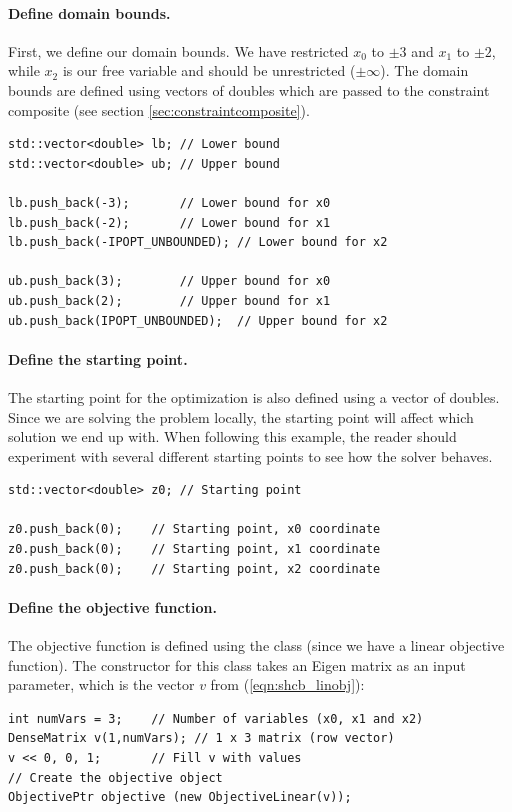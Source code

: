 \paragraph{Define domain bounds.} First, we define our domain bounds. We have restricted $x_0$ to $\pm 3$ and $x_1$ to $\pm2$, while $x_2$ is our free variable and should be unrestricted ($\pm \infty$). The domain bounds are defined using vectors of doubles which are passed to the constraint composite (see section \ref{sec:constraintcomposite}).
\begin{lstlisting}
std::vector<double> lb;	// Lower bound
std::vector<double> ub;	// Upper bound

lb.push_back(-3);		// Lower bound for x0
lb.push_back(-2);		// Lower bound for x1
lb.push_back(-IPOPT_UNBOUNDED);	// Lower bound for x2

ub.push_back(3);		// Upper bound for x0
ub.push_back(2);		// Upper bound for x1
ub.push_back(IPOPT_UNBOUNDED);	// Upper bound for x2
\end{lstlisting}

\paragraph{Define the starting point.} The starting point for the optimization is also defined using a vector of doubles. Since we are solving the problem locally, the starting point will affect which solution we end up with. When following this example, the reader should experiment with several different starting points to see how the solver behaves.
\begin{lstlisting}
std::vector<double> z0;	// Starting point

z0.push_back(0);	// Starting point, x0 coordinate
z0.push_back(0);	// Starting point, x1 coordinate
z0.push_back(0);	// Starting point, x2 coordinate
\end{lstlisting}

\paragraph{Define the objective function.} The objective function  is defined using the  class (since we have a linear objective function). The constructor for this class takes an Eigen matrix as an input parameter, which is the vector $v$ from (\ref{eqn:shcb_linobj}):
\begin{lstlisting}
int numVars = 3;	// Number of variables (x0, x1 and x2)
DenseMatrix v(1,numVars); // 1 x 3 matrix (row vector)
v << 0, 0, 1;		// Fill v with values
// Create the objective object
ObjectivePtr objective (new ObjectiveLinear(v));
\end{lstlisting}

